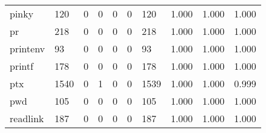 \begin{longtable}{lp{2.0cm}p{2.0cm}p{2.0cm}p{2.0cm}p{2.0cm}p{2.0cm}p{2.0cm}p{2.0cm}p{2.0cm}}
pinky     &                    120 &                                  0 &                                 0 &                                0 &                                 0 &                             120 &                                1.000 &                                  1.000 &                                1.000 \\
pr        &                    218 &                                  0 &                                 0 &                                0 &                                 0 &                             218 &                                1.000 &                                  1.000 &                                1.000 \\
printenv  &                     93 &                                  0 &                                 0 &                                0 &                                 0 &                              93 &                                1.000 &                                  1.000 &                                1.000 \\
printf    &                    178 &                                  0 &                                 0 &                                0 &                                 0 &                             178 &                                1.000 &                                  1.000 &                                1.000 \\
ptx       &                   1540 &                                  0 &                                 1 &                                0 &                                 0 &                            1539 &                                1.000 &                                  1.000 &                                0.999 \\
pwd       &                    105 &                                  0 &                                 0 &                                0 &                                 0 &                             105 &                                1.000 &                                  1.000 &                                1.000 \\
readlink  &                    187 &                                  0 &                                 0 &                                0 &                                 0 &                             187 &                                1.000 &                                  1.000 &                                1.000 \\

\end{longtable}
